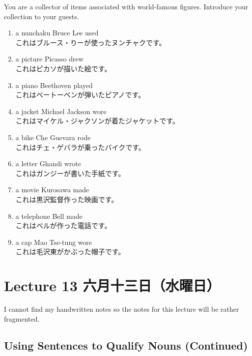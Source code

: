 \documentclass[notoc,notitlepage]{tufte-book}
\begin{document}
\begin{ex}
  You are a collector of items associated with world-famous figures. Introduce your collection to your guests.

  \begin{enumerate}
    \item a nunchaku Bruce Lee used \\
      これはブルース・りーが使ったヌンチャクです。
    \item a picture Picasso drew \\
      これはピカソが描いた絵です。
    \item a piano Beethoven played \\
      これはベートーベンが弾いたピアノです。
    \item a jacket Michael Jackson wore \\
      これはマイケル・ジャクソンが着たジャケットです。
    \item a bike Che Guevara rode \\
      これはチェ・ゲバラが乗ったバイクです。
    \item a letter Ghandi wrote \\
      これはガンジーが書いた手紙です。
    \item a movie Kurosawa made \\
      これは黒沢監督作った映画です。
    \item a telephone Bell made \\
      これはベルが作った電話です。
    \item a cap Mao Tse-tung wore \\
      これは毛沢東がかぶった帽子です。
  \end{enumerate}
\end{ex}



\chapter{Lecture 13 六月十三日（水曜日）}%
\label{chp:lecture_13_liu_yue_shi_san_ri_shui_yao_ri_}

I cannot find my handwritten notes so the notes for this lecture will be rather fragmented.

\section{Using Sentences to Qualify Nouns (Continued)}%
\label{sec:using_sentences_to_qualify_nouns_continued}
\end{document}
